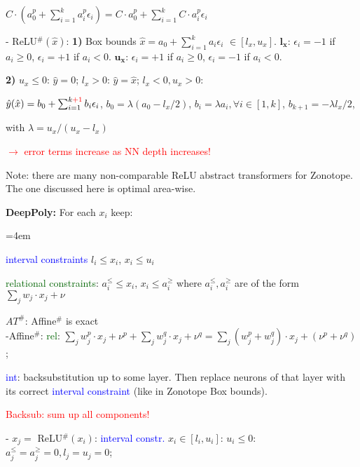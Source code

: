 \documentclass[11pt,landscape,a4paper,fleqn]{article}
\begin{document}
\begin{multicols*}{4}
$C \cdot (a_0^p + \sum_{i=1}^{k} a_i^p \epsilon_i) = C \cdot a_0^p + \sum_{i=1}^{k} C \cdot a_i^p \epsilon_i$

- ReLU$^\#(\hat{x})$: \textbf{1)} Box bounds $\hat{x}$$ = a_0 + \sum_{i=1}^{k} a_i\epsilon_i$ $\in [l_x,u_x]$. $\mathbf{l_x}$: $\epsilon_i = -1$ if $a_i \geq 0$, $\epsilon_i = +1$ if $a_i < 0$. $\mathbf{u_x}$: $\epsilon_i = +1$ if $a_i \geq 0$, $\epsilon_i = -1$ if $a_i < 0$.

\textbf{2)} $u_x \leq 0$: $\hat{y} = 0$; $l_x > 0$: $\hat{y} = \hat{x}$; $l_x < 0, u_x > 0$:

$\hat{y}(\hat{x}) = b_0 + \sum_{i=1}^{k\textcolor{red}{+1}} b_i \epsilon_i$, $b_0 = \lambda(a_0 - l_x/2)$, $b_i = \lambda a_i, \forall i \in [1,k]$, $b_{k+1} = -\lambda l_x / 2$,

with $\lambda = u_x / (u_x - l_x)$

\textcolor{red}{$\rightarrow$ error terms increase as NN depth increases!}

Note: there are many non-comparable ReLU abstract transformers for Zonotope. The one discussed here is optimal area-wise.
\vspace*{1mm}

\textbf{DeepPoly:} For each $x_i$ keep:

\begin{compactitem}=4em
	\item \textcolor{blue}{interval constraints} $l_i \leq x_i$, $x_i \leq u_i$
	\item \textcolor{darkgreen}{relational constraints}: $a_i^\leq \leq x_i$, $x_i \leq a_i^\geq$ where $a_i^\leq, a_i^\geq$ are of the form $\sum_j w_j \cdot x_j + \nu$
\end{compactitem}
\vspace*{1mm}

$AT^\#$: Affine$^\#$ is exact\\
-Affine$^\#$: \textcolor{darkgreen}{rel}: $\sum_j w_j^p \cdot x_j + \nu^p + \sum_j w_j^q \cdot x_j + \nu^q = \sum_j (w_j^p + w_j^q) \cdot x_j + (\nu^p + \nu^q)$;

\textcolor{blue}{int}: backsubstitution up to some layer. Then replace neurons of that layer with its correct \textcolor{blue}{interval constraint} (like in Zonotope Box bounds).

\textcolor{red}{Backsub: sum up all components!}

- $x_j =$ ReLU$^\#(x_i)$: \textcolor{blue}{interval constr.} $x_i \in [l_i, u_i]$:
{$u_i \leq 0$:} $a_j^\leq = a_j^\geq = 0, l_j = u_j = 0$;


\end{multicols*}
\end{document}
